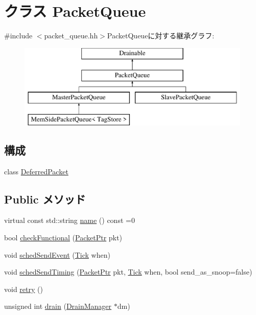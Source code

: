 \hypertarget{classPacketQueue}{
\section{クラス PacketQueue}
\label{classPacketQueue}
}


{\ttfamily \#include $<$packet\_\-queue.hh$>$}PacketQueueに対する継承グラフ:\begin{figure}[H]
\begin{center}
\leavevmode
\includegraphics[height=4cm]{classPacketQueue}
\end{center}
\end{figure}
\subsection*{構成}
\begin{DoxyCompactItemize}
\item 
class \hyperlink{classPacketQueue_1_1DeferredPacket}{DeferredPacket}
\end{DoxyCompactItemize}
\subsection*{Public メソッド}
\begin{DoxyCompactItemize}
\item 
virtual const std::string \hyperlink{classPacketQueue_a2d319721a65496069642871a52e47056}{name} () const =0
\item 
bool \hyperlink{classPacketQueue_a8eb60d4744b6212ad749f3a586759266}{checkFunctional} (\hyperlink{classPacket}{PacketPtr} pkt)
\item 
void \hyperlink{classPacketQueue_af99adfc2df426c1ebd4e1fcb804c7e4d}{schedSendEvent} (\hyperlink{base_2types_8hh_a5c8ed81b7d238c9083e1037ba6d61643}{Tick} when)
\item 
void \hyperlink{classPacketQueue_a9b0fd72bebb706403e57dd17daff1f40}{schedSendTiming} (\hyperlink{classPacket}{PacketPtr} pkt, \hyperlink{base_2types_8hh_a5c8ed81b7d238c9083e1037ba6d61643}{Tick} when, bool send\_\-as\_\-snoop=false)
\item 
void \hyperlink{classPacketQueue_a549fc33ae3e5c345795b8384a91fb544}{retry} ()
\item 
unsigned int \hyperlink{classPacketQueue_aa8a18d230dba7a674ac8a0b4f35bc36a}{drain} (\hyperlink{classDrainManager}{DrainManager} $\ast$dm)
\end{DoxyCompactItemize}
